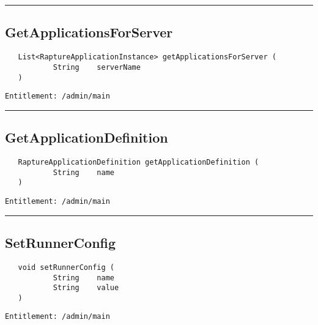 \rule{12cm}{2pt}
\subsection{GetApplicationsForServer}
\label{Api:GetApplicationsForServer}
\begin{verbatim}
   List<RaptureApplicationInstance> getApplicationsForServer (
           String    serverName
   )
\end{verbatim}
\begin{Verbatim}[fontsize=\small, formatcom=\color{Maroon}]
  Entitlement: /admin/main
\end{Verbatim}



\rule{12cm}{2pt}
\subsection{GetApplicationDefinition}
\label{Api:GetApplicationDefinition}
\begin{verbatim}
   RaptureApplicationDefinition getApplicationDefinition (
           String    name
   )
\end{verbatim}
\begin{Verbatim}[fontsize=\small, formatcom=\color{Maroon}]
  Entitlement: /admin/main
\end{Verbatim}



\rule{12cm}{2pt}
\subsection{SetRunnerConfig}
\label{Api:SetRunnerConfig}
\begin{verbatim}
   void setRunnerConfig (
           String    name
           String    value
   )
\end{verbatim}
\begin{Verbatim}[fontsize=\small, formatcom=\color{Maroon}]
  Entitlement: /admin/main
\end{Verbatim}



